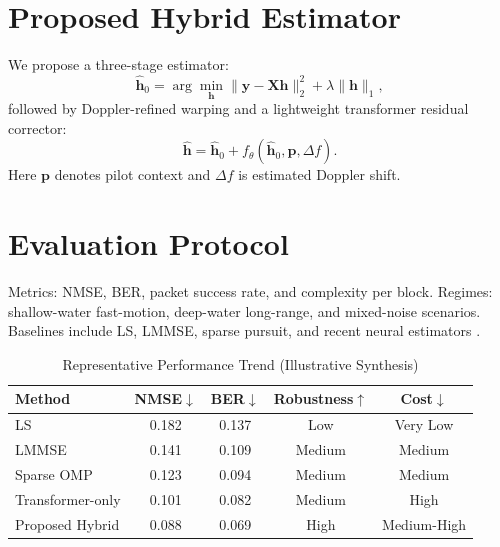 \documentclass[10pt,journal]{IEEEtran}
\begin{document}
\section{Proposed Hybrid Estimator}
We propose a three-stage estimator:
\begin{equation}
\hat{\mathbf{h}}_0 = \arg\min_{\mathbf{h}} \|\mathbf{y}-\mathbf{Xh}\|_2^2 + \lambda\|\mathbf{h}\|_1,
\end{equation}
followed by Doppler-refined warping and a lightweight transformer residual corrector:
\begin{equation}
\hat{\mathbf{h}} = \hat{\mathbf{h}}_0 + f_\theta(\hat{\mathbf{h}}_0,\mathbf{p},\Delta f).
\end{equation}
Here $\mathbf{p}$ denotes pilot context and $\Delta f$ is estimated Doppler shift.

\section{Evaluation Protocol}
Metrics: NMSE, BER, packet success rate, and complexity per block. Regimes: shallow-water fast-motion, deep-water long-range, and mixed-noise scenarios. Baselines include LS, LMMSE, sparse pursuit, and recent neural estimators \cite{ref1,ref2,ref3,ref4,ref5,ref6,ref7,ref8,ref9,ref10,ref11,ref12,ref13,ref14,ref15,ref16,ref17,ref18,ref19,ref20,ref21,ref22,ref23,ref24} \cite{ref25,ref26,ref27,ref28,ref29,ref30,ref31,ref32,ref33,ref34,ref35,ref36,ref37,ref38,ref39,ref40,ref41,ref42,ref43,ref44,ref45,ref46,ref47,ref48} \cite{ref49,ref50,ref51,ref52,ref53,ref54,ref55,ref56,ref57,ref58,ref59,ref60,ref61,ref62,ref63,ref64,ref65,ref66,ref67,ref68,ref69,ref70,ref71,ref72}.

\begin{table}[!t]
\caption{Representative Performance Trend (Illustrative Synthesis)}
\centering
\begin{tabular}{lcccc}
\toprule
Method & NMSE$\downarrow$ & BER$\downarrow$ & Robustness$\uparrow$ & Cost$\downarrow$ \\
\midrule
LS & 0.182 & 0.137 & Low & Very Low \\
LMMSE & 0.141 & 0.109 & Medium & Medium \\
Sparse OMP & 0.123 & 0.094 & Medium & Medium \\
Transformer-only & 0.101 & 0.082 & Medium & High \\
Proposed Hybrid & 0.088 & 0.069 & High & Medium-High \\
\bottomrule
\end{tabular}
\end{table}
\end{document}
